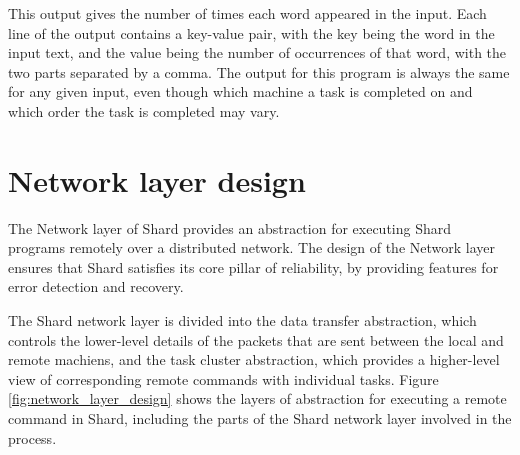 \documentclass[twoside]{report}
\begin{document}
This output gives the number of times each word appeared in the input.
Each line of the output contains a key-value pair, with the key being the word in the input text, and the value being the number of occurrences of that word, with the two parts separated by a comma.
The output for this program is always the same for any given input, even though which machine a task is completed on and which order the task is completed may vary.

\section{Network layer design}


The Network layer of Shard provides an abstraction for executing Shard programs remotely over a distributed network.
The design of the Network layer ensures that Shard satisfies its core pillar of reliability, by providing features for error detection and recovery.

The Shard network layer is divided into the data transfer abstraction, which controls the lower-level details of the packets that are sent between the local and remote machiens, and the task cluster abstraction, which provides a higher-level view of corresponding remote commands with individual tasks.
Figure \ref{fig:network_layer_design} shows the layers of abstraction for executing a remote command in Shard, including the parts of the Shard network layer involved in the process.
\end{document}
